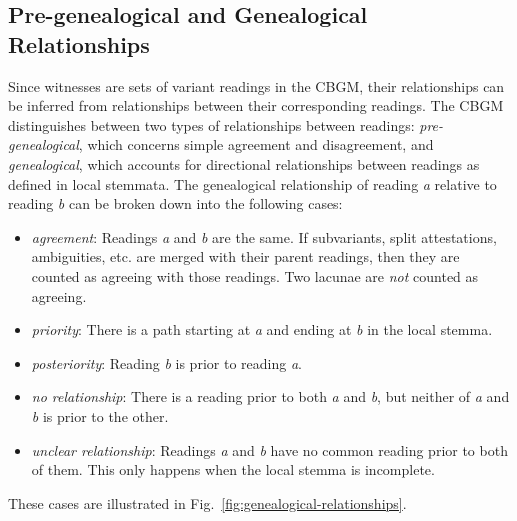 \documentclass[a4paper, 12pt]{article}
\begin{document}
	\subsection{Pre-genealogical and Genealogical Relationships}\label{subsec:relationships}
	Since witnesses are sets of variant readings in the CBGM, their relationships can be inferred from relationships between their corresponding readings. The CBGM distinguishes between two types of relationships between readings: \emph{pre-genealogical}, which concerns simple agreement and disagreement, and \emph{genealogical}, which accounts for directional relationships between readings as defined in local stemmata. The genealogical relationship of reading \emph{a} relative to reading \emph{b} can be broken down into the following cases:
	\begin{itemize}
		\item\emph{agreement}: Readings \emph{a} and \emph{b} are the same. If subvariants, split attestations, ambiguities, etc. are merged with their parent readings, then they are counted as agreeing with those readings. Two lacunae are \emph{not} counted as agreeing.
		\item\emph{priority}: There is a path starting at \emph{a} and ending at \emph{b} in the local stemma.
		\item\emph{posteriority}: Reading \emph{b} is prior to reading \emph{a}.
		\item\emph{no relationship}: There is a reading prior to both \emph{a} and \emph{b}, but neither of \emph{a} and \emph{b} is prior to the other.
		\item\emph{unclear relationship}: Readings \emph{a} and \emph{b} have no common reading prior to both of them. This only happens when the local stemma is incomplete.
	\end{itemize}
	These cases are illustrated in Fig.~\ref{fig:genealogical-relationships}.
	
\end{document}
